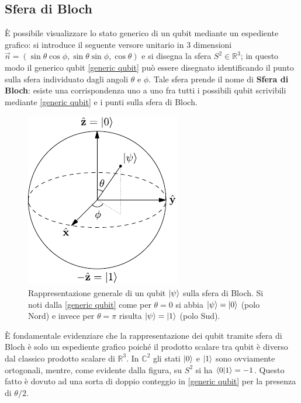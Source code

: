 \subsection{Sfera di Bloch}
È possibile visualizzare lo stato generico di un qubit mediante un espediente grafico: si introduce il seguente versore unitario in 3 dimensioni $\vec{n} = (\sin \theta \cos \phi, \sin \theta \sin \phi, \cos \theta)$ e si disegna la sfera $S^2 \in \mathbb{R}^3$; in questo modo il generico qubit \eqref{generic qubit} può essere disegnato identificando il punto sulla sfera individuato dagli angoli $\theta$ e $\phi$. Tale sfera prende il nome di \textbf{Sfera di Bloch}: esiste una corrispondenza uno a uno fra tutti i possibili qubit scrivibili mediante \eqref{generic qubit} e i punti sulla sfera di Bloch. 

\begin{figure}[!ht]
    \centering
    \includegraphics[scale=1.4]{images/Bloch_Sphere.pdf}
    \caption{Rappresentazione generale di un qubit $\ket{\psi}$ sulla sfera di Bloch. Si noti dalla \eqref{generic qubit} come per $\theta = 0$ si abbia $\ket{\psi} = \ket{0} $ (polo Nord) e invece per $\theta = \pi$ risulta $\ket{\psi} = \ket{1}$ (polo Sud).}
    \label{fig:BlochSphere}
\end{figure}

\noindent È fondamentale evidenziare che la rappresentazione dei qubit tramite sfera di Bloch è solo un espediente grafico poiché il prodotto scalare tra qubit è diverso dal classico prodotto scalare di $\mathbb{R}^3$. In $\mathbb{C}^2$ gli stati $\ket{0}$ e $\ket{1}$ sono ovviamente ortogonali, mentre, come evidente dalla figura, su $S^2$ si ha $\braket{0}{1} = -1$. Questo fatto è dovuto ad una sorta di doppio conteggio in \eqref{generic qubit} per la presenza di $\theta/2$.